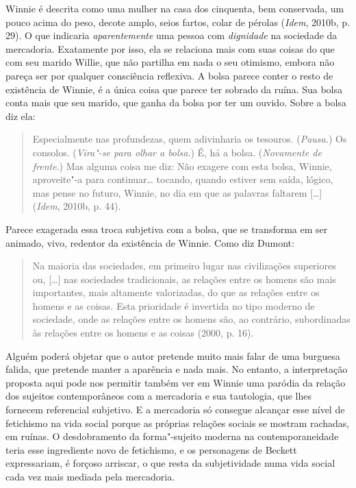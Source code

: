 Winnie é descrita como uma mulher na casa dos cinquenta, bem conservada,
um pouco acima do peso, decote amplo, seios fartos, colar de pérolas
(\emph{Idem}, 2010b, p. 29). O que indicaria \emph{aparentemente} uma
pessoa com \emph{dignidade} na sociedade da mercadoria. Exatamente por
isso, ela se relaciona mais com suas coisas do que com seu marido
Willie, que não partilha em nada o seu otimismo, embora não pareça ser
por qualquer consciência reflexiva. A bolsa parece conter o resto de
existência de Winnie, é a única coisa que parece ter sobrado da ruína.
Sua bolsa conta mais que seu marido, que ganha da bolsa por ter um
ouvido. Sobre a bolsa diz ela:

\begin{quote}
Especialmente nas profundezas, quem adivinharia os tesouros.
(\emph{Pausa.}) Os consolos. (\emph{Vira"-se para olhar a bolsa}.) É, há
a bolsa. (\emph{Novamente de frente}.) Mas alguma coisa me diz: Não
exagere com esta bolsa, Winnie, aproveite"-a para continuar\ldots{} tocando,
quando estiver sem saída, lógico, mas pense no futuro, Winnie, no dia em
que as palavras faltarem [\ldots{}] (\emph{Idem}, 2010b, p. 44).
\end{quote}

Parece exagerada essa troca subjetiva com a bolsa, que se transforma em
ser animado, vivo, redentor da existência de Winnie. Como diz Dumont:

\begin{quote}
Na maioria das sociedades, em primeiro lugar nas civilizações superiores
ou, [\ldots{}] nas sociedades tradicionais, as relações entre os homens
são mais importantes, mais altamente valorizadas, do que as relações
entre os homens e as coisas. Esta prioridade é invertida no tipo moderno
de sociedade, onde as relações entre os homens são, ao contrário,
subordinadas às relações entre os homens e as coisas (2000, p. 16).
\end{quote}

Alguém poderá objetar que o autor pretende muito mais falar de uma
burguesa falida, que pretende manter a aparência e nada mais. No
entanto, a interpretação proposta aqui pode nos permitir também ver em Winnie uma
paródia da relação dos sujeitos contemporâneos com a mercadoria e sua
tautologia, que lhes fornecem referencial subjetivo. E a mercadoria só
consegue alcançar esse nível de fetichismo na vida social porque as
próprias relações sociais se mostram rachadas, em ruínas. O
desdobramento da forma"-sujeito moderna na contemporaneidade teria esse
ingrediente novo de fetichismo, e os personagens de Beckett
expressariam, é forçoso arriscar, o que resta da subjetividade numa vida
social cada vez mais mediada pela mercadoria.

